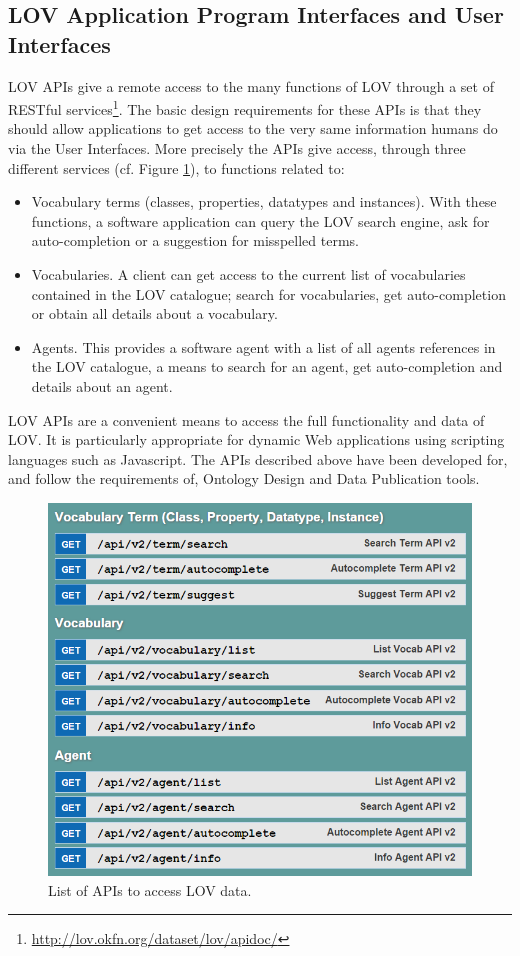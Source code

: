 \documentclass{iosart2c}
\begin{document}
\subsection{LOV Application Program Interfaces and User Interfaces}
LOV APIs give a remote access to the many functions of LOV through a set of RESTful services\footnote{\url{http://lov.okfn.org/dataset/lov/apidoc/}}. The basic design requirements for these APIs is that they should allow applications to get access to the very same information humans do via the User Interfaces. More precisely the APIs give access, through three different services (cf. Figure \ref{fig:apis}), to functions related to:
\begin{itemize} 
			\item Vocabulary terms (classes, properties, datatypes and instances). With these functions, a software application can query the LOV search engine, ask for auto-completion or a suggestion for misspelled terms.
			\item Vocabularies. A client can get access to the current list of vocabularies contained in the LOV catalogue; search for vocabularies, get auto-completion or obtain all details about a vocabulary.
			\item Agents. This provides a software agent with a list of all agents references in the LOV catalogue, a means to search for an agent, get auto-completion and details about an agent.
		\end{itemize}
LOV APIs are a convenient means to access the full functionality and data of LOV. It is particularly appropriate for dynamic Web applications using scripting languages such as Javascript. The APIs described above have been developed for, and follow the requirements of, Ontology Design and Data Publication tools.

\begin{figure}[ht!b]
\includegraphics[scale=0.4]{apis.png}
\caption{List of APIs to access LOV data.}
\label{fig:apis}
\end{figure}
\end{document}
